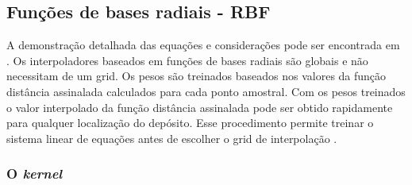\begin{table}[H]
\centering
{}
\caption{\textit{Benchmark} dos diferentes métodos de interpolação.} \label{bench}
\end{table}

\subsection{Funções de bases radiais - RBF}

A demonstração detalhada das equações e considerações  pode ser encontrada em . Os interpoladores baseados em funções de bases radiais são globais e não necessitam de um grid. Os pesos são treinados baseados nos valores da função distância assinalada calculados para cada ponto amostral. Com os pesos treinados o valor interpolado da função distância assinalada pode ser obtido rapidamente para qualquer localização do depósito. Esse procedimento permite treinar o sistema linear de equações antes de escolher o grid de interpolação \cite{martin2017implicitmodeling}.

\subsubsection{O \textit{kernel}}

